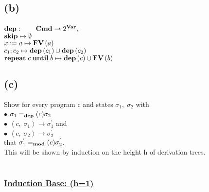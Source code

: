 \documentclass[12pt]{scrartcl}
\newcommand{\Mod}[0]{\text{\textbf{mod}}}
\newcommand{\dep}[0]{\text{\textbf{dep}}}
\begin{document}
	\subsection*{(b)}
	
	\indent\indent $\text{\textbf{dep}}: \qquad \text{\textbf{Cmd}}\rightarrow 2^{\text{\textbf{Var}}}$,\\
	\indent $\text{\textbf{skip}}\mapsto\emptyset$\\
	\indent $x:=a\mapsto \text{\textbf{FV}}\left( a\right)$\\
	\indent $c_1;c_2\mapsto \text{\textbf{dep}}\left( c_1\right) \cup\text{\textbf{dep}}\left( c_2\right)$\\
	\indent $\text{\textbf{repeat}}\; c\; \text{\textbf{until}}\; b \mapsto \text{\textbf{dep}}\left( c\right) \cup \text{\textbf{FV}}\left( b\right)$

	\subsection*{(c)}
	
	\indent\indent Show for every program c and states $\sigma_{1} ,\; \sigma_{2}$ with\\
	\indent\indent $\bullet$ \quad $\sigma_{1} =_\dep(c) \sigma_{2}$\\
	\indent\indent $\bullet$ \quad $\left\langle c,\; \sigma_{1} \right\rangle \rightarrow \sigma^{'}_{1}$ and\\
	\indent\indent $\bullet$ \quad $\left\langle c, \; \sigma_{2}\right\rangle \rightarrow \sigma^{'}_{2}$\\
	\indent that $\sigma^{'}_{1} =_\Mod(c)\sigma^{'}_{2}$.\\
	\indent This will be shown by induction on the height h of derivation trees.\\\\
	\subsubsection*{\underline{Induction Base: (h=1)}}
	
\end{document}
